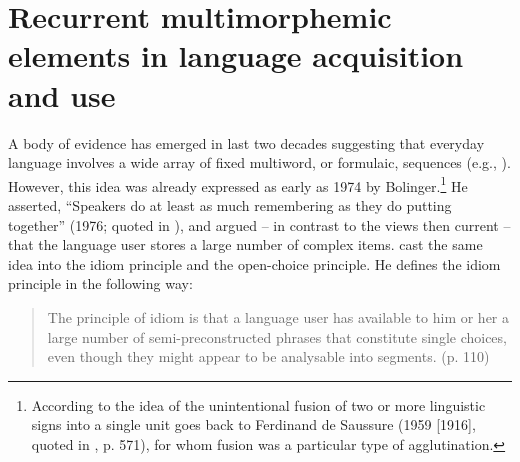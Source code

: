\section{Recurrent multimorphemic elements in language acquisition and use}

A body of evidence has emerged in last two decades suggesting that everyday language involves a wide array of fixed multiword, or formulaic, sequences (e.g., \citealt{corrigan-etal-2009,schmitt2004,wray-2002,wray-2008,taylor-mental-2012}). However, this idea was already expressed as early as 1974 by Bolinger.\footnote{According to \citet{tremblay-etal11} the idea of the unintentional fusion of two or more linguistic signs into a single unit goes back to Ferdinand de Saussure (1959 [1916], quoted in \citealt{tremblay-etal11}, p. 571), for whom fusion was a particular type of agglutination.} He asserted, ``Speakers do at least as much remembering as they do putting together'' (1976; quoted in \citealt[29]{erman-warren-2000}), and argued -- in contrast to the views then current -- that the language user stores a large number of complex items. \citet{sinclair-1991} cast the same idea into the idiom principle and the open-choice principle. He defines the idiom principle in the following way:

\begin{quote}
The principle of idiom is that a language user has available to him or her a large number of semi-preconstructed phrases that constitute single choices, even though they might appear to be analysable into segments. (p. 110)
\end{quote}

